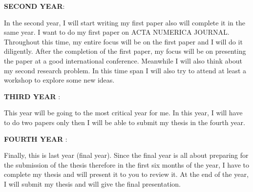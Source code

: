 \documentclass[PhD]{iitmdiss} %
\begin{document}
{\textbf{SECOND YEAR}:
      
      In the second year, I will start writing my first paper also will complete it in the same year. I want to do my first paper on ACTA NUMERICA JOURNAL. Throughout this time, my entire focus will be on the first paper and I will do it diligently. After the completion of the first paper, my focus will be on presenting the paper at a good international conference. Meanwhile I will also think about my second research problem. In this time span I will also try to attend at least a workshop to explore some new ideas.
      \par
       
\textbf{THIRD YEAR} :


       This year will be going to the most critical year for me. In this year, I will have to do two papers only then I will be able to submit my thesis in the fourth year.

\par
\textbf{FOURTH YEAR} :

       Finally, this is last year (final year). Since the final year is all about preparing for the submission of the thesis therefore in the first six months of the year, I have to complete my thesis and will present it to you to review it. At the end of the year, I will submit my thesis and will give the final presentation.


}
\end{document}
